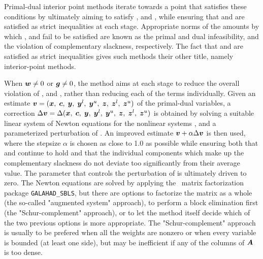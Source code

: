 \documentclass{galahad}
\begin{document}
Primal-dual interior point methods iterate towards a point
that satisfies these conditions by ultimately aiming to satisfy
,  and , while ensuring that 
 and  are 
satisfied as strict inequalities at each stage. 
Appropriate norms of the amounts by 
which ,  and  fail to be satisfied are known as the
primal and dual infeasibility, and the violation of complementary slackness,
respectively. The fact that  and  are satisfied as strict 
inequalities gives such methods their other title, namely 
interior-point methods.

When ${\bm{w}} \neq 0$ or ${\bm{g}} \neq 0$, the method aims at each stage to reduce the
overall violation of ,  and , 
rather than reducing each of the terms individually. Given an estimate 
${\bm{v}} = ({\bm{x}}, \; {\bm{c}}, \; {\bm{y}}, \; {\bm{y}}^{l}, \;
{\bm{y}}^{u}, \; {\bm{z}}, \; {\bm{z}}^{l}, \; {\bm{z}}^{u})$
of the primal-dual variables, a correction
$\Delta {\bm{v}} = \Delta ({\bm{x}}, \; {\bm{c}}, \; {\bm{y}}, \; {\bm{y}}^{l},
 \; {\bm{y}}^{u} ,\;{\bm{z}},\;{\bm{z}}^{l} ,\;{\bm{z}}^{u} )$
is obtained by solving a suitable linear system of Newton equations for the
nonlinear systems ,  and a parameterized perturbation of 
. An improved estimate ${\bm{v}} + \alpha \Delta {\bm{v}}$ 
is then used, where the stepsize $\alpha$
is chosen as close to 1.0 as possible while ensuring both that
 and  continue to hold and that the individual components
which make up the complementary slackness 
 do not deviate too significantly
from their average value. The parameter that controls the perturbation
of  is ultimately driven to zero.
The Newton equations are solved  by applying the 
\galahad\ matrix factorization package 
{\tt GALAHAD\_SBLS}, but there are options 
to factorize the matrix as a whole (the so-called "augmented system"
approach), to perform a block elimination first (the "Schur-complement"
approach), or to let the method itself decide which of the two
previous options is more appropriate.
The "Schur-complement" approach is usually to be prefered when all the
weights are nonzero or when every variable is bounded (at least one side),
but may be inefficient if any of the columns of ${\bm{A}}$ is too dense.
\end{document}
